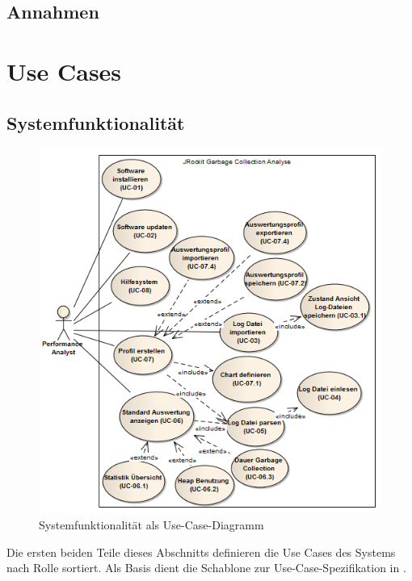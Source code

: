 \subsection{Annahmen}


\section{Use Cases}\label{use_cases}
\subsection{Systemfunktionalität}\label{systemfunktionalitaet}
 \begin{figure}[H]
  	\centering
    	\includegraphics[width=14cm]{images/anforderungen_use-case}
        	\caption{Systemfunktionalität als Use-Case-Diagramm}
\end{figure}
Die ersten beiden Teile dieses Abschnitts definieren die Use Cases des Systems nach Rolle sortiert. Als Basis dient die Schablone zur Use-Case-Spezifikation in \cite[S. 78-79]{pohl2010basiswissen}.





